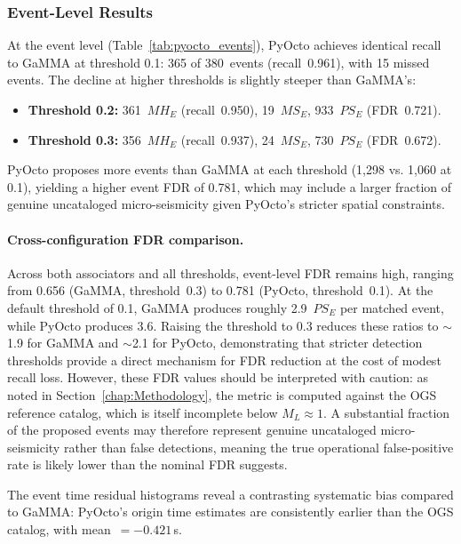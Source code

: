 \subsubsection{Event-Level Results}
At the event level (Table~\ref{tab:pyocto_events}), PyOcto achieves identical
recall to GaMMA at threshold 0.1: 365 of 380~events (recall~0.961), with 15
missed events. The decline at higher thresholds is slightly steeper than
GaMMA's:
\begin{itemize}
  \item \textbf{Threshold 0.2:} 361~$MH_E$ (recall~0.950), 19~$MS_E$,
    933~$PS_E$ (\ac{FDR}~0.721).
  \item \textbf{Threshold 0.3:} 356~$MH_E$ (recall~0.937), 24~$MS_E$,
    730~$PS_E$ (\ac{FDR}~0.672).
\end{itemize}
PyOcto proposes more events than GaMMA at each threshold (1,298 vs. 1,060 at
0.1), yielding a higher event FDR of 0.781, which may include a larger fraction
of genuine uncataloged micro-seismicity given PyOcto's stricter spatial
constraints.

\paragraph{Cross-configuration FDR comparison.}
Across both associators and all thresholds, event-level \ac{FDR} remains high,
ranging from 0.656 (GaMMA, threshold~0.3) to 0.781 (PyOcto, threshold~0.1). At
the default threshold of 0.1, GaMMA produces roughly 2.9~$PS_E$ per matched
event, while PyOcto produces 3.6. Raising the threshold to 0.3 reduces these
ratios to $\sim$1.9 for GaMMA and $\sim$2.1 for PyOcto, demonstrating that
stricter detection thresholds provide a direct mechanism for \ac{FDR} reduction
at the cost of modest recall loss. However, these \ac{FDR} values should be
interpreted with caution: as noted in Section~\ref{chap:Methodology}, the
metric is computed against the OGS reference catalog, which is itself
incomplete below $M_L \approx 1$. A substantial fraction of the proposed events
may therefore represent genuine uncataloged micro-seismicity rather than false
detections, meaning the true operational false-positive rate is likely lower
than the nominal \ac{FDR} suggests.

The event time residual histograms reveal a contrasting systematic bias
compared to GaMMA: PyOcto's origin time estimates are consistently earlier than
the OGS catalog, with mean~$= -0.421$\,s.

